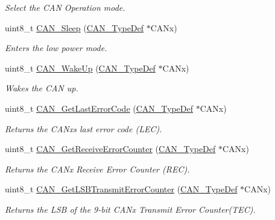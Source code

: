 \begin{DoxyCompactItemize}
\begin{DoxyCompactList}\small\item\em Select the C\+AN Operation mode. \end{DoxyCompactList}\item 
uint8\+\_\+t \mbox{\hyperlink{group___c_a_n___exported___functions_ga640215e38765759d7eceb8a039046667}{C\+A\+N\+\_\+\+Sleep}} (\mbox{\hyperlink{struct_c_a_n___type_def}{C\+A\+N\+\_\+\+Type\+Def}} $\ast$C\+A\+Nx)
\begin{DoxyCompactList}\small\item\em Enters the low power mode. \end{DoxyCompactList}\item 
uint8\+\_\+t \mbox{\hyperlink{group___c_a_n___exported___functions_ga78cdfbf1884b9e33c552bcbca15bed10}{C\+A\+N\+\_\+\+Wake\+Up}} (\mbox{\hyperlink{struct_c_a_n___type_def}{C\+A\+N\+\_\+\+Type\+Def}} $\ast$C\+A\+Nx)
\begin{DoxyCompactList}\small\item\em Wakes the C\+AN up. \end{DoxyCompactList}\item 
uint8\+\_\+t \mbox{\hyperlink{group___c_a_n___exported___functions_gaaee721a392b6b21bfd15dc160aeb6924}{C\+A\+N\+\_\+\+Get\+Last\+Error\+Code}} (\mbox{\hyperlink{struct_c_a_n___type_def}{C\+A\+N\+\_\+\+Type\+Def}} $\ast$C\+A\+Nx)
\begin{DoxyCompactList}\small\item\em Returns the C\+A\+Nx\textquotesingle{}s last error code (L\+EC). \end{DoxyCompactList}\item 
uint8\+\_\+t \mbox{\hyperlink{group___c_a_n___exported___functions_ga6903eecbec40eb1361d915ddde9a3274}{C\+A\+N\+\_\+\+Get\+Receive\+Error\+Counter}} (\mbox{\hyperlink{struct_c_a_n___type_def}{C\+A\+N\+\_\+\+Type\+Def}} $\ast$C\+A\+Nx)
\begin{DoxyCompactList}\small\item\em Returns the C\+A\+Nx Receive Error Counter (R\+EC). \end{DoxyCompactList}\item 
uint8\+\_\+t \mbox{\hyperlink{group___c_a_n___exported___functions_ga85ee0c35bf7ca15d4e4c862eef534843}{C\+A\+N\+\_\+\+Get\+L\+S\+B\+Transmit\+Error\+Counter}} (\mbox{\hyperlink{struct_c_a_n___type_def}{C\+A\+N\+\_\+\+Type\+Def}} $\ast$C\+A\+Nx)
\begin{DoxyCompactList}\small\item\em Returns the L\+SB of the 9-\/bit C\+A\+Nx Transmit Error Counter(\+T\+E\+C). \end{DoxyCompactList}\item 

\end{DoxyCompactItemize}
